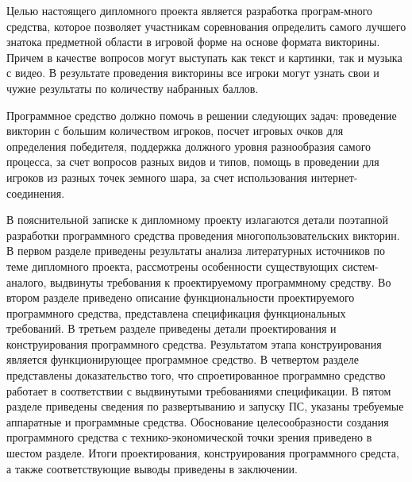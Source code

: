 Целью настоящего дипломного проекта является разработка програм-много средства, которое позволяет участникам соревнования определить самого лучшего знатока предметной области
в игровой форме на основе формата викторины. Причем в качестве вопросов могут выступать как текст и картинки, так и музыка с видео. В результате проведения викторины все игроки
могут узнать свои и чужие результаты по количеству набранных баллов.

Программное средство должно помочь в решении следующих задач: проведение викторин с большим количеством игроков, посчет игровых очков для определения победителя, поддержка должного уровня
разнообразия самого процесса, за счет вопросов разных видов и типов, помощь в проведении для игроков из разных точек земного шара, за счет использования интернет-соединения.

В пояснительной записке к дипломному проекту излагаются детали поэтапной разработки программного средства проведения многопользовательских викторин.
В первом разделе приведены результаты анализа литературных источников по теме дипломного проекта, рассмотрены особенности существующих систем-аналого, выдвинуты требования
к проектируемому программному средству. Во втором разделе приведено описание функциональности проектируемого программного средства, представлена спецификация функциональных требований.
В третьем разделе приведены детали проектирования и конструирования программного средства. Результатом этапа конструирования является функционирующее программное средство. В четвертом
разделе представлены доказательство того, что спроетированное программно средство работает в соответствии с выдвинутыми требованиями спецификации. В пятом разделе приведены сведения
по развертыванию и запуску ПС, указаны требуемые аппаратные и программные средства. Обоснование целесообразности создания программного средства с технико-экономической точки зрения
приведено в шестом разделе. Итоги проектирования, конструирования программного средста, а также соответствующие выводы приведены в заключении.